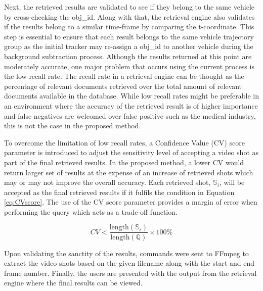 Next, the retrieved results are validated to see if they belong to the same
vehicle by cross-checking the obj\_id. Along with that, the retrieval engine
also validates if the results belong to a similar time-frame by comparing the
t-coordinate. This step is essential to ensure that each result belongs to the
same vehicle trajectory group as the initial tracker may re-assign a obj\_id to
another vehicle during the background subtraction process.
Although the results returned at this point are moderately accurate, one major
problem that occurs using the current process is the low recall rate. The
recall rate in a retrieval engine can be thought as the percentage of relevant
documents retrieved over the total amount of relevant documents available in
the database. While low recall rates might be preferable in an environment
where the accuracy of the retrieved result is of higher importance and false
negatives are welcomed over false positive such as the medical industry, this
is not the case in the proposed method.

To overcome the limitation of low recall rates, a Confidence Value (CV) score
parameter is introduced to adjust the sensitivity level of accepting a video
shot as part of the final retrieved results. In the proposed method, a lower CV
would return larger set of results at the expense of an increase of retrieved
shots which may or may not improve the overall accuracy. Each retrieved shot,
$\mathbb{S}_i$, will be accepted as the final retrieved results if it fulfils
the condition in Equation \ref{eq:CVscore}. The use of the CV score parameter
provides a margin of error when performing the query which acts as a trade-off
function.

\begin{equation}
\label{eq:CVscore}
CV < \frac{\text{length}(\mathbb{S}_i)}{\text{length}(\mathbb{Q})} \times 100\%
\end{equation}

Upon validating the sanctity of the results, commands were sent to FFmpeg to
extract the video shots based on the given filename along with the start and
end frame number. Finally, the users are presented with the output from the
retrieval engine where the final results can be viewed.


